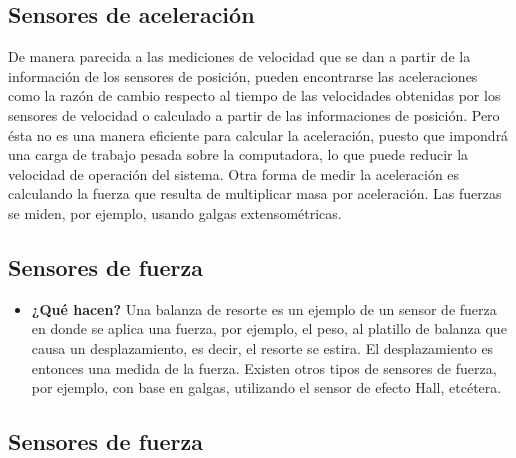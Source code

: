 \subsection{Sensores de aceleración} De manera parecida a las mediciones de velocidad que se dan a partir de la información de los sensores de posición, pueden encontrarse las aceleraciones como la razón de cambio respecto al tiempo de las velocidades obtenidas por los sensores de velocidad o calculado a partir de las informaciones de posición. Pero ésta no es una manera eficiente para calcular la aceleración, puesto que impondrá una carga de trabajo pesada sobre la computadora, lo que puede reducir la velocidad de operación del sistema. Otra forma de medir la aceleración es calculando la fuerza que resulta de multiplicar masa por aceleración. Las fuerzas se miden, por ejemplo, usando galgas extensométricas. 
\subsection*{Sensores de fuerza} 
\begin{itemize}
	\item \textbf{¿Qué hacen?} Una balanza de resorte es un ejemplo de un sensor de fuerza en donde se aplica una fuerza, por ejemplo, el peso, al platillo de balanza que causa un desplazamiento, es decir, el resorte se estira. El desplazamiento es entonces una medida de la fuerza. Existen otros tipos de sensores de fuerza, por ejemplo, con base en galgas, utilizando el sensor de efecto Hall, etcétera. 
\end{itemize}
\subsection{Sensores de fuerza}
